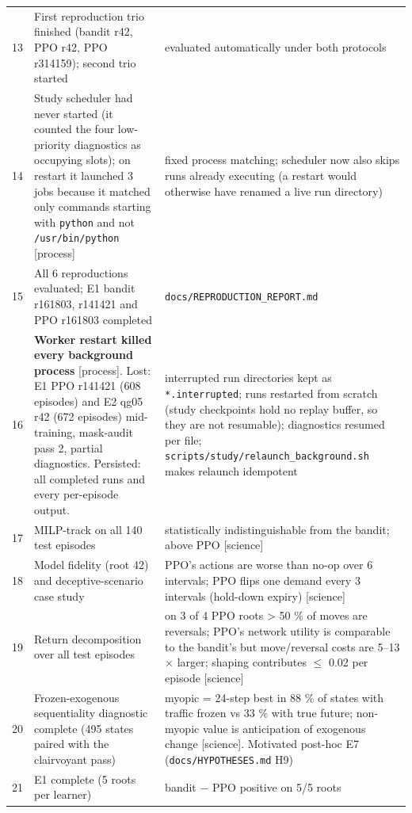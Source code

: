 {\begin{longtable}{@{}rp{}p{}@{}}
13 & First reproduction trio finished (bandit r42, PPO r42, PPO r314159); second trio started & evaluated automatically under both protocols \\
14 & Study scheduler had never started (it counted the four low-priority diagnostics as occupying slots); on restart it launched 3 jobs because it matched only commands starting with \texttt{python} and not \texttt{/\allowbreak{}usr/\allowbreak{}bin/\allowbreak{}python} [process] & fixed process matching; scheduler now also skips runs already executing (a restart would otherwise have renamed a live run directory) \\
15 & All 6 reproductions evaluated; E1 bandit r161803, r141421 and PPO r161803 completed & \texttt{docs/\allowbreak{}REPRODUCTION\_\allowbreak{}REPORT.\allowbreak{}md} \\
16 & \textbf{Worker restart killed every background process} [process]. Lost: E1 PPO r141421 (608 episodes) and E2 qg05 r42 (672 episodes) mid-training, mask-audit pass 2, partial diagnostics. Persisted: all completed runs and every per-episode output. & interrupted run directories kept as \texttt{*.\allowbreak{}interrupted}; runs restarted from scratch (study checkpoints hold no replay buffer, so they are not resumable); diagnostics resumed per file; \texttt{scripts/\allowbreak{}study/\allowbreak{}relaunch\_\allowbreak{}background.\allowbreak{}sh} makes relaunch idempotent \\
17 & MILP-track on all 140 test episodes & statistically indistinguishable from the bandit; above PPO [science] \\
18 & Model fidelity (root 42) and deceptive-scenario case study & PPO's actions are worse than no-op over 6 intervals; PPO flips one demand every 3 intervals (hold-down expiry) [science] \\
19 & Return decomposition over all test episodes & on 3 of 4 PPO roots > 50 \% of moves are reversals; PPO's network utility is comparable to the bandit's but move/reversal costs are 5--13$\times$ larger; shaping contributes $\le$ 0.02 per episode [science] \\
20 & Frozen-exogenous sequentiality diagnostic complete (495 states paired with the clairvoyant pass) & myopic = 24-step best in 88 \% of states with traffic frozen vs 33 \% with true future; non-myopic value is anticipation of exogenous change [science]. Motivated post-hoc E7 (\texttt{docs/\allowbreak{}HYPOTHESES.\allowbreak{}md} H9) \\
21 & E1 complete (5 roots per learner) & bandit $-$ PPO positive on 5/5 roots \\

\end{longtable}}
